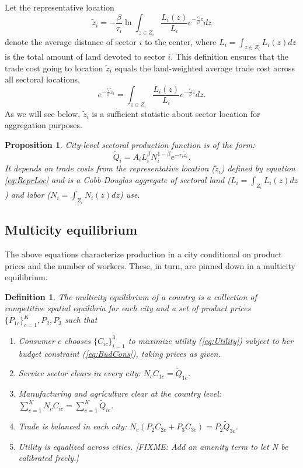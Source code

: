 \documentclass[12pt]{article}
\newtheorem{definition}{Definition}
\newtheorem{proposition}{Proposition}
\begin{document}
Let the representative location
\begin{equation}
\label{eq:ReprLoc}
\tilde z_i = -
\frac{\beta}{\tau_i}
\ln\int_{z\in Z_i} \frac{L_i(z)}{L_i}e^{-\frac{\tau_i}{\beta} z}dz
\end{equation}
denote the average distance of sector $i$ to the center, where $L_i=\int_{z\in Z_i} L_i(z)dz$ is the total amount of land devoted to sector $i$. This definition ensures that the trade cost going to location $\tilde z_i$ equals the land-weighted average trade cost across all sectoral locations,
\[
e^{-\frac{\tau_i}{\beta} \tilde z_i} = \int_{z\in Z_i} \frac{L_i(z)}{L_i}e^{-\frac{\tau_i}{\beta} z}dz.
\]
As we will see below, $\tilde z_i$ is a sufficient statistic about sector location for aggregation purposes. %

\begin{proposition}\label{prop:aggregation}
City-level sectoral production function is of the form:
\begin{equation}
\tilde Q_i =
A_iL_i^{\beta}N_i^{1-\beta}
 e^{-\tau_i\tilde z_i}.
\end{equation}
It depends on trade costs from the representative location ($\tilde{z}_i$) defined by equation \eqref{eq:ReprLoc} and is a Cobb-Douglas aggregate of sectoral land ($L_i=\int_{Z_i}L_i(z)dz$) and labor ($N_i=\int_{Z_i}N_i(z)dz$) use.
\end{proposition}

\subsection{Multicity equilibrium}
The above equations characterize production in a city conditional on product prices and the number of workers. These, in turn, are pinned down in a multicity equilibrium.

\begin{definition}
The multicity equilibrium of a country is a collection of competitive spatial equilibria for each city and a set of product prices $\{P_{1c}\}_{c=1}^K, P_2, P_3$ such that
\begin{enumerate}
    \item Consumer $c$ chooses $\{C_{ic}\}_{i=1}^3$ to maximize utility (\ref{eq:Utility}) subject to her budget constraint (\ref{eq:BudCons}), taking prices as given.
    \item Service sector clears in every city: $N_c C_{1c}=\tilde Q_{1c}$.
    \item Manufacturing and agriculture clear at the country level: $\sum_{c=1}^K N_c C_{ic}=\sum_{c=1}^K\tilde Q_{ic}$.
    \item Trade is balanced in each city: $N_c(P_2C_{2c} + P_3 C_{3c}) = P_2 \tilde Q_{3c}$.
    \item Utility is equalized across cities. 
[FIXME: Add an amenity term to let N be calibrated freely.]
\end{enumerate}
\end{definition}
\end{document}
